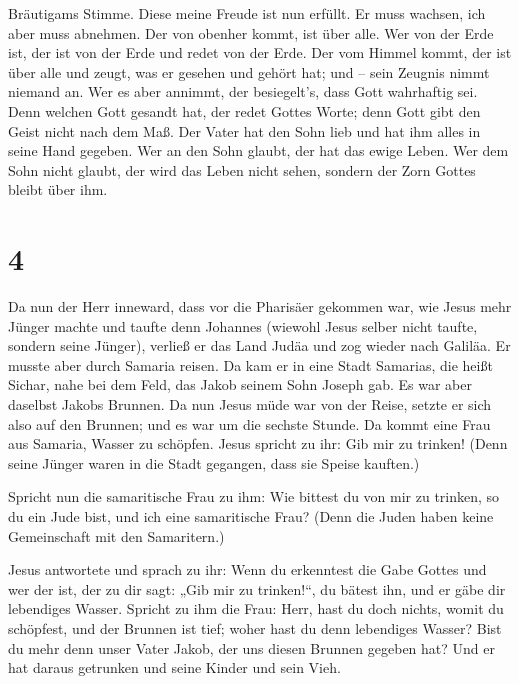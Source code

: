 Bräutigams Stimme. Diese meine Freude ist nun erfüllt. 
Er muss wachsen, ich aber muss abnehmen.  Der von obenher
kommt, ist über alle. Wer von der Erde ist, der ist von der Erde und
redet von der Erde. Der vom Himmel kommt, der ist über alle
 und zeugt, was er gesehen und gehört hat; und -- sein
Zeugnis nimmt niemand an.  Wer es aber annimmt, der
besiegelt's, dass Gott wahrhaftig sei.  Denn welchen Gott
gesandt hat, der redet Gottes Worte; denn Gott gibt den Geist nicht nach
dem Maß.  Der Vater hat den Sohn lieb und hat ihm alles
in seine Hand gegeben.  Wer an den Sohn glaubt, der hat
das ewige Leben. Wer dem Sohn nicht glaubt, der wird das Leben nicht
sehen, sondern der Zorn Gottes bleibt über ihm.

\hypertarget{section-3}{%
\section{4}\label{section-3}}

 Da nun der Herr inneward, dass vor die Pharisäer gekommen
war, wie Jesus mehr Jünger machte und taufte denn Johannes
 (wiewohl Jesus selber nicht taufte, sondern seine
Jünger),  verließ er das Land Judäa und zog wieder nach
Galiläa.  Er musste aber durch Samaria reisen.
 Da kam er in eine Stadt Samarias, die heißt Sichar, nahe
bei dem Feld, das Jakob seinem Sohn Joseph gab.  Es war
aber daselbst Jakobs Brunnen. Da nun Jesus müde war von der Reise,
setzte er sich also auf den Brunnen; und es war um die sechste Stunde.
 Da kommt eine Frau aus Samaria, Wasser zu schöpfen. Jesus
spricht zu ihr: Gib mir zu trinken!  (Denn seine Jünger
waren in die Stadt gegangen, dass sie Speise kauften.)

 Spricht nun die samaritische Frau zu ihm: Wie bittest du
von mir zu trinken, so du ein Jude bist, und ich eine samaritische Frau?
(Denn die Juden haben keine Gemeinschaft mit den Samaritern.)

 Jesus antwortete und sprach zu ihr: Wenn du erkenntest
die Gabe Gottes und wer der ist, der zu dir sagt: „Gib mir zu
trinken!{}``, du bätest ihn, und er gäbe dir lebendiges Wasser.
 Spricht zu ihm die Frau: Herr, hast du doch nichts,
womit du schöpfest, und der Brunnen ist tief; woher hast du denn
lebendiges Wasser?  Bist du mehr denn unser Vater Jakob,
der uns diesen Brunnen gegeben hat? Und er hat daraus getrunken und
seine Kinder und sein Vieh.

